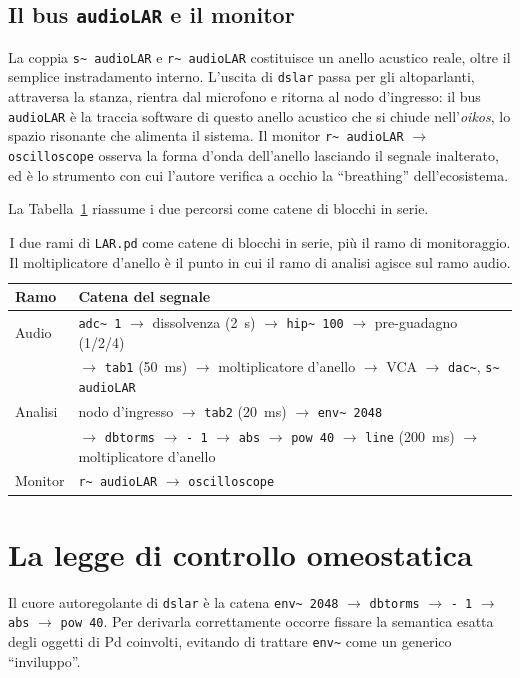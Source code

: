 \documentclass[11pt,a4paper]{article}
\begin{document}
\subsection{Il bus \texttt{audioLAR} e il monitor}
La coppia \texttt{s\textasciitilde{} audioLAR} e \texttt{r\textasciitilde{} audioLAR} costituisce un anello acustico reale, oltre il semplice instradamento interno.
L'uscita di \texttt{dslar} passa per gli altoparlanti, attraversa la stanza, rientra dal microfono e ritorna al nodo d'ingresso: il bus \texttt{audioLAR} è la traccia software di questo anello acustico che si chiude nell'\emph{oikos}, lo spazio risonante che alimenta il sistema.
Il monitor \texttt{r\textasciitilde{} audioLAR} $\to$ \texttt{oscilloscope} osserva la forma d'onda dell'anello lasciando il segnale inalterato, ed è lo strumento con cui l'autore verifica a occhio la ``breathing'' dell'ecosistema.

La Tabella~\ref{tab:flusso} riassume i due percorsi come catene di blocchi in serie.

\begin{table}[htbp]
\centering
\small
\begin{tabular}{@{}ll@{}}
\toprule
Ramo & Catena del segnale \\
\midrule
Audio & \texttt{adc\textasciitilde{} 1} $\to$ dissolvenza (\SI{2}{\second}) $\to$ \texttt{hip\textasciitilde{} 100} $\to$ pre-guadagno (1/2/4) \\
      & \quad $\to$ \texttt{tab1} (\SI{50}{\milli\second}) $\to$ moltiplicatore d'anello $\to$ VCA $\to$ \texttt{dac\textasciitilde{}}, \texttt{s\textasciitilde{} audioLAR} \\[2pt]
Analisi & nodo d'ingresso $\to$ \texttt{tab2} (\SI{20}{\milli\second}) $\to$ \texttt{env\textasciitilde{} 2048} \\
        & \quad $\to$ \texttt{dbtorms} $\to$ \texttt{- 1} $\to$ \texttt{abs} $\to$ \texttt{pow 40} $\to$ \texttt{line} (\SI{200}{\milli\second}) $\to$ moltiplicatore d'anello \\[2pt]
Monitor & \texttt{r\textasciitilde{} audioLAR} $\to$ \texttt{oscilloscope} \\
\bottomrule
\end{tabular}
\caption{I due rami di \texttt{LAR.pd} come catene di blocchi in serie, più il ramo di monitoraggio. Il moltiplicatore d'anello è il punto in cui il ramo di analisi agisce sul ramo audio.}
\label{tab:flusso}
\end{table}

\section{La legge di controllo omeostatica}\label{sec:controllo}
Il cuore autoregolante di \texttt{dslar} è la catena \texttt{env\textasciitilde{} 2048} $\to$ \texttt{dbtorms} $\to$ \texttt{- 1} $\to$ \texttt{abs} $\to$ \texttt{pow 40}.
Per derivarla correttamente occorre fissare la semantica esatta degli oggetti di Pd coinvolti, evitando di trattare \texttt{env\textasciitilde{}} come un generico ``inviluppo''.
\end{document}

